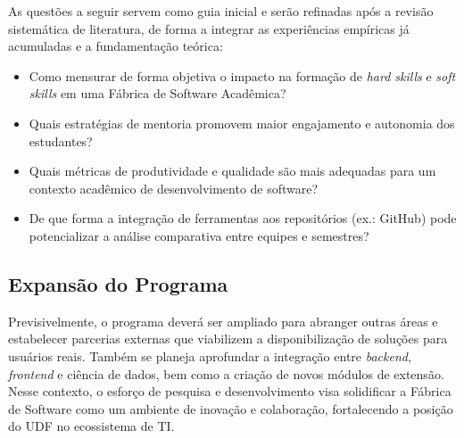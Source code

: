 \documentclass[
	12pt,           %
	openright,      %
	oneside,        %
	a4paper,        %
	brazil          %
]{abntex2}
\begin{document}
As questões a seguir servem como guia inicial e serão refinadas após a revisão sistemática de literatura, de forma a integrar as experiências empíricas já acumuladas e a fundamentação teórica:
\begin{itemize}
    \item Como mensurar de forma objetiva o impacto na formação de \emph{hard skills} e \emph{soft skills} em uma Fábrica de Software Acadêmica?
    \item Quais estratégias de mentoria promovem maior engajamento e autonomia dos estudantes?
    \item Quais métricas de produtividade e qualidade são mais adequadas para um contexto acadêmico de desenvolvimento de software?
    \item De que forma a integração de ferramentas aos repositórios (ex.: GitHub) pode potencializar a análise comparativa entre equipes e semestres?
\end{itemize}

\subsection{Expansão do Programa}
Previsivelmente, o programa deverá ser ampliado para abranger outras áreas e estabelecer parcerias externas que viabilizem a disponibilização de soluções para usuários reais. Também se planeja aprofundar a integração entre \emph{backend}, \emph{frontend} e ciência de dados, bem como a criação de novos módulos de extensão. Nesse contexto, o esforço de pesquisa e desenvolvimento visa solidificar a Fábrica de Software como um ambiente de inovação e colaboração, fortalecendo a posição do UDF no ecossistema de TI.

\postextual



%
%
\end{document}
